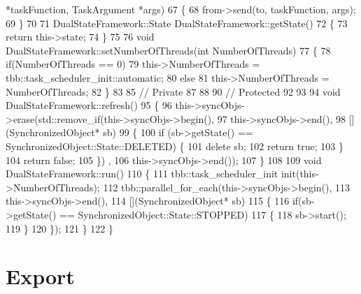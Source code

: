 \begin{DoxyCodeInclude}
      *taskFunction, TaskArgument *args)
67     \{
68         from->send(to, taskFunction, args);
69     \}
70     
71     DualStateFramework::State DualStateFramework::getState()
72     \{
73         \textcolor{keywordflow}{return} this->state;
74     \}
75     
76     \textcolor{keywordtype}{void} DualStateFramework::setNumberOfThreads(\textcolor{keywordtype}{int} NumberOfThreads)
77     \{
78         \textcolor{keywordflow}{if}(NumberOfThreads == 0)
79             this->NumberOfThreads = tbb::task\_scheduler\_init::automatic;
80         \textcolor{keywordflow}{else}
81             this->NumberOfThreads = NumberOfThreads;
82     \}
83     
85     \textcolor{comment}{// Private}
87 \textcolor{comment}{}    
88     
90     \textcolor{comment}{// Protected}
92 \textcolor{comment}{}
93     
94     \textcolor{keywordtype}{void} DualStateFramework::refresh()
95     \{
96         this->syncObjs->erase(std::remove\_if(this->syncObjs->begin(),
97                                              this->syncObjs->end(),
98                                              [](SynchronizedObject* sb)
99                                              \{
100                                                  \textcolor{keywordflow}{if} (sb->getState() == SynchronizedObject::State::DELETED) 
      \{
101                                                      \textcolor{keyword}{delete} sb;
102                                                      \textcolor{keywordflow}{return} \textcolor{keyword}{true};
103                                                  \}
104                                                  \textcolor{keywordflow}{return} \textcolor{keyword}{false};
105                                              \}) ,
106                               this->syncObjs->end());
107     \}
108     
109     \textcolor{keywordtype}{void} DualStateFramework::run()
110     \{
111         tbb::task\_scheduler\_init init(this->NumberOfThreads);
112         tbb::parallel\_for\_each(this->syncObjs->begin(),
113                                this->syncObjs->end(),
114                                [](SynchronizedObject* sb)
115                                \{
116                                    \textcolor{keywordflow}{if}(sb->getState() == SynchronizedObject::State::STOPPED)
117                                    \{
118                                        sb->start();
119                                    \}
120                                \});
121     \}
122 \}
\end{DoxyCodeInclude}
 \hypertarget{_dual_state_framework_DualStateFrameworkExport}{}\section{Export}\label{_dual_state_framework_DualStateFrameworkExport}
